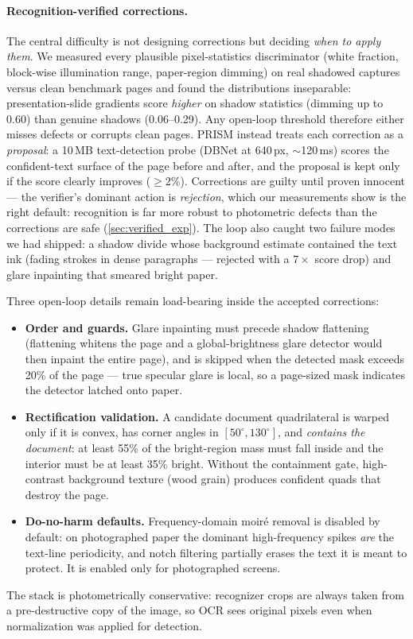 \paragraph{Recognition-verified corrections.}
The central difficulty is not designing corrections but deciding \emph{when to apply them}. We measured every plausible pixel-statistics discriminator (white fraction, block-wise illumination range, paper-region dimming) on real shadowed captures versus clean benchmark pages and found the distributions inseparable: presentation-slide gradients score \emph{higher} on shadow statistics (dimming up to 0.60) than genuine shadows (0.06--0.29). Any open-loop threshold therefore either misses defects or corrupts clean pages. PRISM instead treats each correction as a \emph{proposal}: a 10\,MB text-detection probe (DBNet at 640\,px, $\sim$120\,ms) scores the confident-text surface of the page before and after, and the proposal is kept only if the score clearly improves ($\geq 2\%$). Corrections are guilty until proven innocent --- the verifier's dominant action is \emph{rejection}, which our measurements show is the right default: recognition is far more robust to photometric defects than the corrections are safe (\cref{sec:verified_exp}). The loop also caught two failure modes we had shipped: a shadow divide whose background estimate contained the text ink (fading strokes in dense paragraphs --- rejected with a $7\times$ score drop) and glare inpainting that smeared bright paper.

Three open-loop details remain load-bearing inside the accepted corrections:
\begin{itemize}
\item \textbf{Order and guards.} Glare inpainting must precede shadow flattening (flattening whitens the page and a global-brightness glare detector would then inpaint the entire page), and is skipped when the detected mask exceeds 20\% of the page --- true specular glare is local, so a page-sized mask indicates the detector latched onto paper.
\item \textbf{Rectification validation.} A candidate document quadrilateral is warped only if it is convex, has corner angles in $[50^\circ,130^\circ]$, and \emph{contains the document}: at least 55\% of the bright-region mass must fall inside and the interior must be at least 35\% bright. Without the containment gate, high-contrast background texture (wood grain) produces confident quads that destroy the page.
\item \textbf{Do-no-harm defaults.} Frequency-domain moir\'e removal is disabled by default: on photographed paper the dominant high-frequency spikes \emph{are} the text-line periodicity, and notch filtering partially erases the text it is meant to protect. It is enabled only for photographed screens.
\end{itemize}
The stack is photometrically conservative: recognizer crops are always taken from a pre-destructive copy of the image, so OCR sees original pixels even when normalization was applied for detection.

